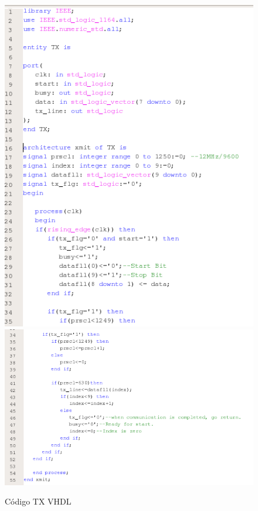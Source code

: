 \documentclass[osajnl,twocolumn,showpacs,superscriptaddress,10pt]{revtex4-1}
\begin{document}
\begin{figure}[H]
    \centering
    \includegraphics[scale=0.4]{images/tx1.png}
    \includegraphics[scale=0.4]{images/tx2.png}
    \caption{Código TX VHDL}
\end{figure}
\end{document}
